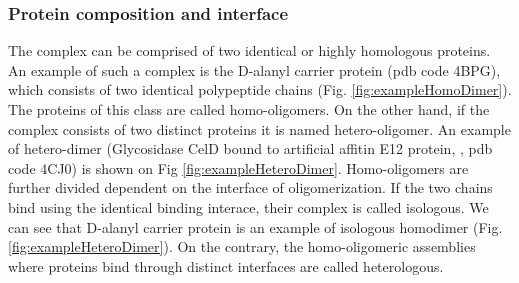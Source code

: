 \subsubsection{Protein composition and interface}
The complex can be comprised of two identical or highly homologous proteins. An example of such a complex is the D-alanyl carrier protein (pdb code 4BPG), which consists of two identical
polypeptide chains (Fig. \ref{fig:exampleHomoDimer}). The proteins of this class are called homo-oligomers. On the other hand, if the complex consists of two distinct proteins it is named hetero-oligomer. 
An example of hetero-dimer (Glycosidase CelD bound to artificial affitin E12 protein, \cite{correa2014potent}, pdb code 4CJ0) is shown on Fig \ref{fig:exampleHeteroDimer}. 
Homo-oligomers are further divided dependent on the interface of oligomerization. If the two chains bind using the identical binding interace, their complex is called isologous. 
We can see that D-alanyl carrier protein is an example of isologous homodimer (Fig. \ref{fig:exampleHeteroDimer}). On the contrary, the homo-oligomeric assemblies where proteins bind through distinct
interfaces are called heterologous. 
